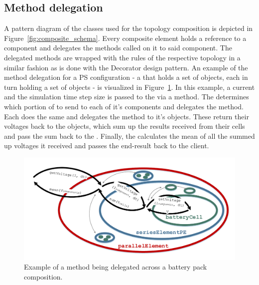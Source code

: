 \subsection{Method delegation}
A pattern diagram of the classes used for the topology composition is depicted in Figure~\ref{fig:composite_schema}. Every composite element holds a reference to a component and delegates the methods called on it to said component. The delegated methods are wrapped with the rules of the respective topology in a similar fashion as is done with the Decorator design pattern. An example of the method delegation for a PS configuration - a  that holds a set of  objects, each in turn holding a set of  objects - is visualized in Figure~\ref{fig:method_delegation}. In this example, a current  and the simulation time step size is passed to the  via a  method. The  determines which portion of  to send to each of it's components and delegates the method. Each  does the same and delegates the method to it's  objects. These return their voltages back to the  objects, which sum up the results received from their cells and pass the sum back to the . Finally, the  calculates the mean of all the summed up voltages it received and passes the end-result back to the client.
\begin{figure}[t!]
	\captionsetup{type=figure}
	\centering
	\includegraphics[width=\textwidth]{method_delegation.pdf}
	\caption[Example of a method being delegated across a battery pack composition]{Example of a method being delegated across a battery pack composition.}
	\label{fig:method_delegation}
\end{figure}
